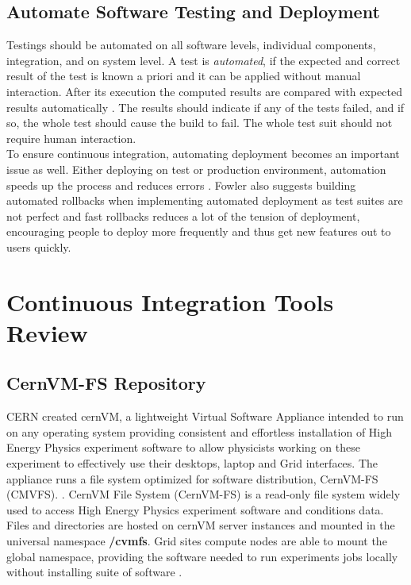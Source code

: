\documentclass [titlepage,11pt]{article}
\begin{document}
\subsection{Automate Software Testing and Deployment}
Testings should be automated on all software levels, individual components, integration, and on system level. A test is {\it automated}, if the expected and correct result of the test is known a priori and it can be applied without manual interaction. After its execution the computed results are compared with expected results automatically \citep{joachim11}. The results should indicate if any of the tests failed, and if so, the whole test should cause the build to fail. The whole test suit should not require human interaction. \\

To ensure continuous integration, automating deployment becomes an important issue as well. Either deploying on test or production environment, automation speeds up the process and reduces errors \citep{fowler06}. Fowler also suggests building automated rollbacks when implementing automated deployment as test suites are not perfect and fast rollbacks reduces a lot of the tension of deployment, encouraging people to deploy more frequently and thus get new features out to users quickly.
\clearpage

\section{Continuous Integration Tools Review}
\subsection{CernVM-FS Repository}
CERN created cernVM, a lightweight Virtual Software Appliance intended to run on any operating system providing consistent and effortless installation of High Energy Physics experiment software to allow physicists working on these experiment to effectively use their desktops, laptop and Grid interfaces. The appliance runs a file system optimized for software distribution, CernVM-FS (CMVFS). \citep{bunic10}. CernVM File System (CernVM-FS) is a read-only file system widely used to access High Energy Physics experiment software and conditions data. Files and directories are hosted on cernVM server instances and mounted in the universal namespace \textbf{/cvmfs}. Grid sites compute nodes are able to mount the global namespace, providing the software needed to run experiments jobs locally without installing suite of software \citep{blomer12}.\\
\end{document}

